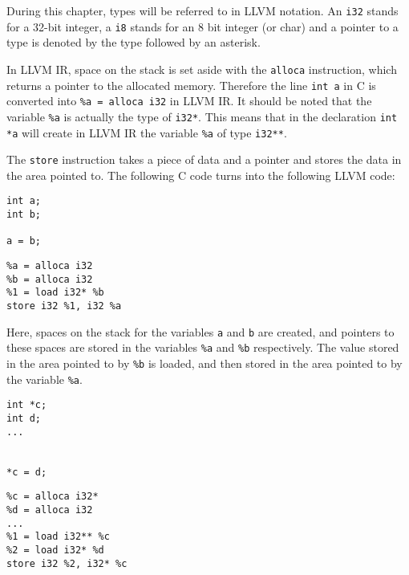 During this chapter, types will be referred to in LLVM notation.
An \verb!i32! stands for a 32-bit integer, a \verb!i8! stands for an 8 bit integer (or char) and a pointer to a type is denoted by the type followed by an asterisk.

In LLVM IR, space on the stack is set aside with the \verb!alloca! instruction, which returns a pointer to the allocated memory.
Therefore the line \verb!int a! in C is converted into \verb!%a = alloca i32! in LLVM IR.
It should be noted that the variable \verb!%a! is actually the type of \verb!i32*!.
This means that in the declaration \verb!int *a! will create in LLVM IR the variable \verb!%a! of type \verb!i32**!.

The \verb!store! instruction takes a piece of data and a pointer and stores the data in the area pointed to.
The following C code turns into the following LLVM code:

\begin{minipage}[t]{0.5\linewidth}
\begin{verbatim}
int a;
int b;

a = b;
\end{verbatim}
\end{minipage}
\begin{minipage}[t]{0.5\linewidth}
\begin{verbatim}
%a = alloca i32
%b = alloca i32
%1 = load i32* %b
store i32 %1, i32 %a
\end{verbatim}
\end{minipage}

Here, spaces on the stack for the variables \verb!a! and \verb!b! are created, and pointers to these spaces are stored in the variables \verb!%a! and \verb!%b! respectively.
The value stored in the area pointed to by \verb!%b! is loaded, and then stored in the area pointed to by the variable \verb!%a!.

\begin{minipage}[t]{0.5\linewidth}
\begin{verbatim}
int *c;
int d;
...


*c = d;
\end{verbatim}
\end{minipage}
\begin{minipage}[t]{0.5\linewidth}
\begin{verbatim}
%c = alloca i32*
%d = alloca i32
...
%1 = load i32** %c
%2 = load i32* %d
store i32 %2, i32* %c
\end{verbatim}
\end{minipage}

